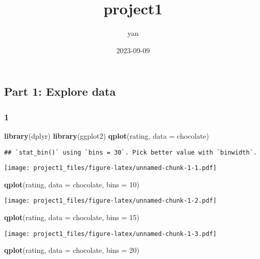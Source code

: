 \documentclass[
]{article}
\title{project1}
\author{yan}
\date{2023-09-09}
\newenvironment{Shaded}{\begin{snugshade}}{\end{snugshade}}
\newcommand{\AttributeTok}[1]{\textcolor[rgb]{0.13,0.29,0.53}{#1}}
\newcommand{\DecValTok}[1]{\textcolor[rgb]{0.00,0.00,0.81}{#1}}
\newcommand{\FunctionTok}[1]{\textcolor[rgb]{0.13,0.29,0.53}{\textbf{#1}}}
\newcommand{\NormalTok}[1]{#1}
\begin{document}
\maketitle

\hypertarget{part-1-explore-data}{%
\subsection{Part 1: Explore data}\label{part-1-explore-data}}

\hypertarget{section}{%
\subsubsection{1}\label{section}}

\begin{Shaded}
\begin{Highlighting}[]
\FunctionTok{library}\NormalTok{(dplyr)}
\FunctionTok{library}\NormalTok{(ggplot2)}
\FunctionTok{qplot}\NormalTok{(rating, }\AttributeTok{data =}\NormalTok{ chocolate)}
\end{Highlighting}
\end{Shaded}

\begin{verbatim}
## `stat_bin()` using `bins = 30`. Pick better value with `binwidth`.
\end{verbatim}

\texttt{[image: project1\_files/figure-latex/unnamed-chunk-1-1.pdf]}

\begin{Shaded}
\begin{Highlighting}[]
\FunctionTok{qplot}\NormalTok{(rating, }\AttributeTok{data =}\NormalTok{ chocolate, }\AttributeTok{bins =} \DecValTok{10}\NormalTok{)}
\end{Highlighting}
\end{Shaded}

\texttt{[image: project1\_files/figure-latex/unnamed-chunk-1-2.pdf]}

\begin{Shaded}
\begin{Highlighting}[]
\FunctionTok{qplot}\NormalTok{(rating, }\AttributeTok{data =}\NormalTok{ chocolate, }\AttributeTok{bins =} \DecValTok{15}\NormalTok{)}
\end{Highlighting}
\end{Shaded}

\texttt{[image: project1\_files/figure-latex/unnamed-chunk-1-3.pdf]}

\begin{Shaded}
\begin{Highlighting}[]
\FunctionTok{qplot}\NormalTok{(rating, }\AttributeTok{data =}\NormalTok{ chocolate, }\AttributeTok{bins =} \DecValTok{20}\NormalTok{)}
\end{Highlighting}
\end{Shaded}
\end{document}
